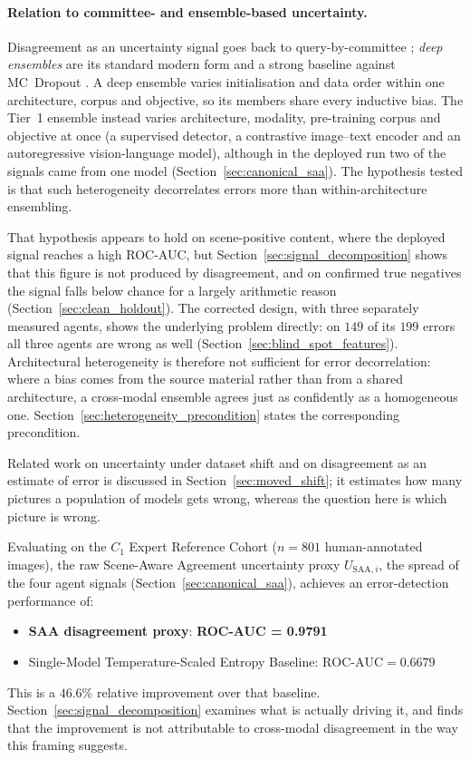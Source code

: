 \documentclass[12pt,a4paper]{report}
\begin{document}
\paragraph{Relation to committee- and ensemble-based uncertainty.} Disagreement as an uncertainty signal goes back to query-by-committee \cite{seung1992qbc}; \textit{deep ensembles} \cite{deepensembles2017} are its standard modern form and a strong baseline against MC~Dropout \cite{gal2016dropout}. A deep ensemble varies initialisation and data order within one architecture, corpus and objective, so its members share every inductive bias. The Tier~1 ensemble instead varies architecture, modality, pre-training corpus and objective at once (a supervised detector, a contrastive image--text encoder and an autoregressive vision-language model), although in the deployed run two of the signals came from one model (Section~\ref{sec:canonical_saa}). The hypothesis tested is that such heterogeneity decorrelates errors more than within-architecture ensembling.

That hypothesis appears to hold on scene-positive content, where the deployed signal reaches a high ROC-AUC, but Section~\ref{sec:signal_decomposition} shows that this figure is not produced by disagreement, and on confirmed true negatives the signal falls below chance for a largely arithmetic reason (Section~\ref{sec:clean_holdout}). The corrected design, with three separately measured agents, shows the underlying problem directly: on $149$ of its $199$ errors all three agents are wrong as well (Section~\ref{sec:blind_spot_features}). Architectural heterogeneity is therefore not sufficient for error decorrelation: where a bias comes from the source material rather than from a shared architecture, a cross-modal ensemble agrees just as confidently as a homogeneous one. Section~\ref{sec:heterogeneity_precondition} states the corresponding precondition.

Related work on uncertainty under dataset shift and on disagreement as an estimate of error \cite{ovadia2019trust,jiang2022disagreement,baek2022agreement} is discussed in Section~\ref{sec:moved_shift}; it estimates how many pictures a population of models gets wrong, whereas the question here is which picture is wrong.

Evaluating on the $C_1$ Expert Reference Cohort ($n=801$ human-annotated images), the raw Scene-Aware Agreement uncertainty proxy $U_{\text{SAA},i}$, the spread of the four agent signals (Section~\ref{sec:canonical_saa}), achieves an error-detection performance of:
\begin{itemize}
    \item \textbf{SAA disagreement proxy}: \textbf{ROC-AUC = 0.9791}
    \item Single-Model Temperature-Scaled Entropy Baseline: $\text{ROC-AUC} = 0.6679$
\end{itemize}
This is a $46.6\%$ relative improvement over that baseline. Section~\ref{sec:signal_decomposition} examines what is actually driving it, and finds that the improvement is not attributable to cross-modal disagreement in the way this framing suggests.
\end{document}
